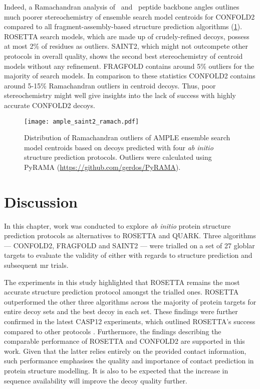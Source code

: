 Indeed, a Ramachandran analysis of \textphi\ and \textpsi\ peptide backbone angles outlines much poorer stereochemistry of ensemble search model centroids for CONFOLD2 compared to all fragment-assembly-based structure prediction algorithms (\cref{fig:ample_saint2_ramach}). ROSETTA search models, which are made up of crudely-refined decoys, possess at most 2\% of residues as outliers. SAINT2, which might not outcompete other protocols in overall quality, shows the second best stereochemistry of centroid models without any refinement.  FRAGFOLD contains around 5\% outliers for the majority of search models. In comparison to these statistics CONFOLD2 contains around 5-15\% Ramachandran outliers in centroid decoys. Thus, poor stereochemistry might well give insights into the lack of success with highly accurate CONFOLD2 decoys.

\begin{figure}[H]
    \centering
    \texttt{[image: ample\_saint2\_ramach.pdf]}
    \caption[Distribution of Ramachandran outliers of AMPLE ensemble search model centroids]{Distribution of Ramachandran outliers of AMPLE ensemble search model centroids based on decoys predicted with four \textit{ab initio} structure prediction protocols. Outliers were calculated using PyRAMA (\href{https://github.com/gerdos/PyRAMA}{https://github.com/gerdos/PyRAMA}).}
    \label{fig:ample_saint2_ramach}
\end{figure}

\section{Discussion}
In this chapter, work was conducted to explore \textit{ab initio} protein structure prediction protocols as alternatives to ROSETTA and QUARK. Three algorithms --- CONFOLD2, FRAGFOLD and SAINT2 --- were trialled on a set of 27 globlar targets to evaluate the validity of either with regards to structure prediction and subsequent \gls{mr} trials.

The experiments in this study highlighted that ROSETTA remains the most accurate structure prediction protocol amongst the trialled ones. ROSETTA outperformed the other three algorithms across the majority of protein targets for entire decoy sets and the best decoy in each set. These findings were further confirmed in the latest CASP12 experiments, which outlined ROSETTA's success compared to other protocols \cite{Ovchinnikov2017-wp,Abriata2018-lu}. Furthermore, the findings describing the comparable performance of ROSETTA and CONFOLD2 \cite{Adhikari2018-lj,Michel2017-xh} are supported in this work. Given that the latter relies entirely on the provided contact information, such performance emphasises the quality and importance of contact prediction in protein structure modelling. It is also to be expected that the increase in sequence availability will improve the decoy quality further.

